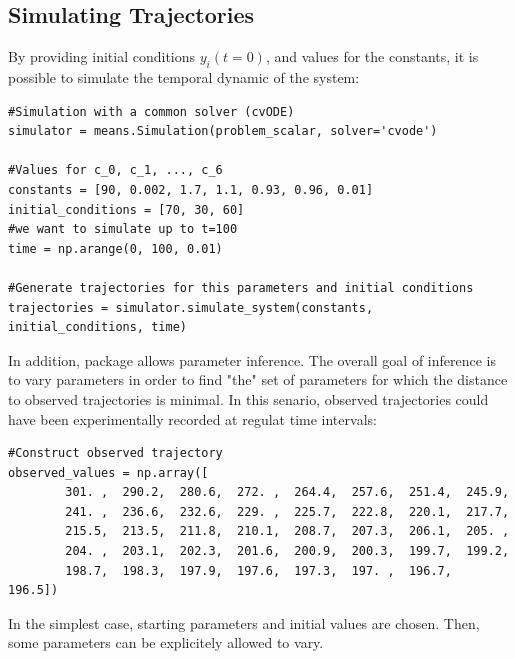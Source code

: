 \subsection{Simulating Trajectories}
By providing initial conditions $y_i(t=0)$, and values for the constants, it is possible to simulate the temporal dynamic of the system:



\begin{framed}
\begin{verbatim}
#Simulation with a common solver (cvODE)
simulator = means.Simulation(problem_scalar, solver='cvode')

#Values for c_0, c_1, ..., c_6
constants = [90, 0.002, 1.7, 1.1, 0.93, 0.96, 0.01]
initial_conditions = [70, 30, 60]
#we want to simulate up to t=100
time = np.arange(0, 100, 0.01)

#Generate trajectories for this parameters and initial conditions
trajectories = simulator.simulate_system(constants, initial_conditions, time)
\end{verbatim}
\end{framed}

In addition, \means{} package allows parameter inference.
The overall goal of inference is to vary parameters in order to find "the" set of parameters for which the distance to observed trajectories is minimal.
In this senario, observed trajectories could have been experimentally recorded at regulat time intervals:

\begin{framed}
\begin{verbatim}
#Construct observed trajectory
observed_values = np.array([ 
        301. ,  290.2,  280.6,  272. ,  264.4,  257.6,  251.4,  245.9,
        241. ,  236.6,  232.6,  229. ,  225.7,  222.8,  220.1,  217.7,
        215.5,  213.5,  211.8,  210.1,  208.7,  207.3,  206.1,  205. ,
        204. ,  203.1,  202.3,  201.6,  200.9,  200.3,  199.7,  199.2,
        198.7,  198.3,  197.9,  197.6,  197.3,  197. ,  196.7,  196.5])

\end{verbatim}
\end{framed}

In the simplest case, starting parameters and initial values are chosen.
Then, some parameters can be explicitely allowed to vary. 

